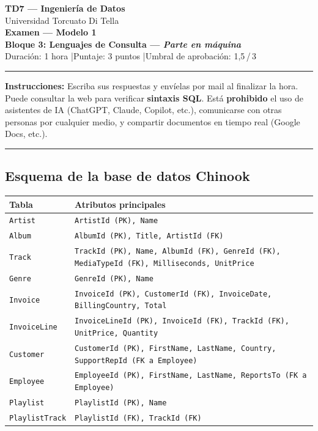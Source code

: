 \documentclass[11pt,a4paper]{article}
\begin{document}
\begin{center}
  {\LARGE\bfseries TD7 — Ingeniería de Datos}\\[6pt]
  {\large Universidad Torcuato Di Tella}\\[4pt]
  {\Large\bfseries Examen — Modelo 1}\\[2pt]
  {\large\bfseries Bloque 3: Lenguajes de Consulta \textnormal{---} \textit{Parte en máquina}}\\[4pt]
  {\normalsize Duración: 1 hora \quad|\quad Puntaje: 3 puntos \quad|\quad Umbral de aprobación: 1{,}5\,/\,3}
\end{center}
\noindent\rule{\linewidth}{0.8pt}
\vspace{2pt}

\noindent\textbf{Instrucciones:} Escriba sus respuestas y envíelas por mail al finalizar la hora. Puede consultar la web para verificar \textbf{sintaxis SQL}. Está \textbf{prohibido} el uso de asistentes de IA (ChatGPT, Claude, Copilot, etc.), comunicarse con otras personas por cualquier medio, y compartir documentos en tiempo real (Google Docs, etc.).

\vspace{6pt}
\noindent\rule{\linewidth}{0.4pt}

\subsection*{Esquema de la base de datos Chinook}

\begin{center}\small
\begin{tabular}{ll}
\toprule
\textbf{Tabla} & \textbf{Atributos principales} \\
\midrule
\texttt{Artist}       & \texttt{ArtistId (PK), Name} \\
\texttt{Album}        & \texttt{AlbumId (PK), Title, ArtistId (FK)} \\
\texttt{Track}        & \texttt{TrackId (PK), Name, AlbumId (FK), GenreId (FK), MediaTypeId (FK), Milliseconds, UnitPrice} \\
\texttt{Genre}        & \texttt{GenreId (PK), Name} \\
\texttt{Invoice}      & \texttt{InvoiceId (PK), CustomerId (FK), InvoiceDate, BillingCountry, Total} \\
\texttt{InvoiceLine}  & \texttt{InvoiceLineId (PK), InvoiceId (FK), TrackId (FK), UnitPrice, Quantity} \\
\texttt{Customer}     & \texttt{CustomerId (PK), FirstName, LastName, Country, SupportRepId (FK a Employee)} \\
\texttt{Employee}     & \texttt{EmployeeId (PK), FirstName, LastName, ReportsTo (FK a Employee)} \\
\texttt{Playlist}     & \texttt{PlaylistId (PK), Name} \\
\texttt{PlaylistTrack}& \texttt{PlaylistId (FK), TrackId (FK)} \\
\bottomrule
\end{tabular}
\end{center}
\end{document}
